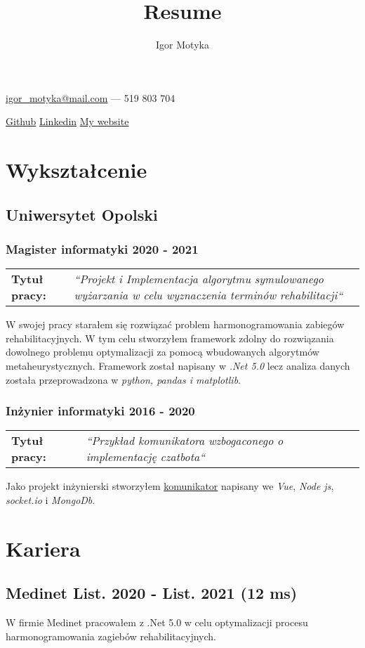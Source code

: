 \documentclass[10pt]{article}
\author{Igor Motyka}
\title{Resume}
\makeatletter
\renewcommand{\maketitle}{
 \begin{center}
    \huge\bfseries\theauthor
 \end{center}
 \begin{center}
    \href{mailto:igor\_motyka@mail.com}{igor\_motyka@mail.com} --- 519 803 704 \\
 \end{center}
 \begin{center}
	 \href{https://github.com/Anav0}{Github} \hspace{0.7cm} \href{https://www.linkedin.com/in/igor-m-873439168/}{Linkedin} \hspace{0.7cm} \href{https://igormotyka.netlify.app/}{My website}
 \end{center}
 }
\makeatother
\begin{document}
\maketitle

\section{Wykształcenie}
\subsection{Uniwersytet Opolski}
\subsubsection{Magister informatyki 2020 - 2021}
\begin{table}[H]
    \begin{tabularx}{\textwidth}{@{}l X}
     \textbf{Tytuł pracy:} & \textit{``Projekt i Implementacja algorytmu symulowanego wyżarzania w celu wyznaczenia terminów rehabilitacji``} \\
    \end{tabularx}
\end{table}
\noindent W swojej pracy starałem się rozwiązać problem harmonogramowania zabiegów rehabilitacyjnych. W tym celu stworzyłem framework zdolny do rozwiązania dowolnego problemu optymalizacji za pomocą wbudowanych algorytmów metaheurystycznych. Framework został napisany w \emph{.Net 5.0} lecz analiza danych została przeprowadzona w \emph{python, pandas i matplotlib}.
\subsubsection{Inżynier informatyki 2016 - 2020}
\begin{table}[H]
    \begin{tabularx}{\textwidth}{@{}l X}
    \textbf{Tytuł pracy:} &  \textit{``Przykład komunikatora wzbogaconego o implementację czatbota``}\\
    \end{tabularx}
\end{table}
\noindent Jako projekt inżynierski stworzyłem \href{https://www.behance.net/gallery/91600605/Gymba-chat}{komunikator} napisany we \emph{Vue}, \emph{Node js}, \emph{socket.io} i \emph{MongoDb}.
\section{Kariera}
\subsection{Medinet List. 2020 - List. 2021 (12 ms)}
W firmie Medinet pracowałem z .Net 5.0 w celu optymalizacji procesu harmonogramowania zagiebów rehabilitacyjnych.
\end{document}

